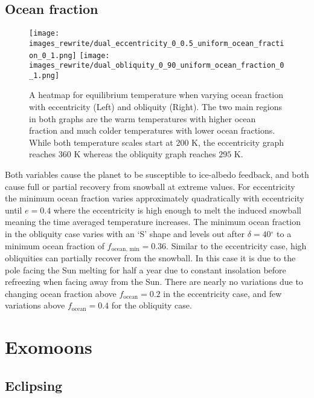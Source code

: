 \documentclass[12pt, onecolumn]{revtex4-2}    %
\newcommand{\degrees}{\ensuremath{^{\circ}}}
\begin{document}
\subsection{Ocean fraction} \label{ssec:qualitative_oceanfraction}
\begin{figure}
  \texttt{[image: images\_rewrite/dual\_eccentricity\_0\_0.5\_uniform\_ocean\_fraction\_0\_1.png]}
  \texttt{[image: images\_rewrite/dual\_obliquity\_0\_90\_uniform\_ocean\_fraction\_0\_1.png]}
  \caption{
    A heatmap for equilibrium temperature when varying ocean fraction with eccentricity (Left) and obliquity (Right).
    The two main regions in both graphs are the warm temperatures with higher ocean fraction and much colder temperatures with lower ocean fractions.
    While both temperature scales start at $200$ K, the eccentricity graph reaches $360$ K whereas the obliquity graph reaches $295$ K.
  }
  \label{fig:qualitative_oceanfraction}
\end{figure}

Both variables cause the planet to be susceptible to ice-albedo feedback, and both cause full or partial recovery from snowball at extreme values.
For eccentricity the minimum ocean fraction varies approximately quadratically with eccentricity until $e = 0.4$ where the eccentricity is high enough to melt the induced snowball meaning the time averaged temperature increases.
The minimum ocean fraction in the obliquity case varies with an `S' shape and levels out after $\delta = 40\degrees$ to a minimum ocean fraction of $f_\text{ocean, min} = 0.36$.
Similar to the eccentricity case, high obliquities can partially recover from the snowball. In this case it is due to the pole facing the Sun melting for half a year due to constant insolation before refreezing when facing away from the Sun.
There are nearly no variations due to changing ocean fraction above $f_\text{ocean} = 0.2$ in the eccentricity case, and few variations above $f_\text{ocean} = 0.4$ for the obliquity case.

\section{Exomoons} \label{sec:Exomoons}
\subsection{Eclipsing} \label{ssec:InvEclipsing}
\end{document}
